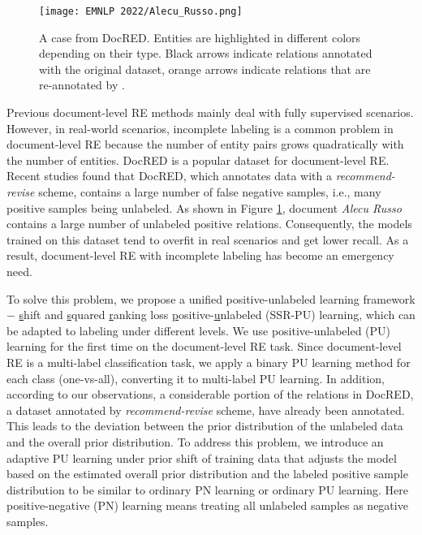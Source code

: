 \documentclass[11pt]{article}
\begin{document}
\begin{figure}
\centering
\texttt{[image: EMNLP 2022/Alecu\_Russo.png]} 
\caption{A case from DocRED. Entities are highlighted in different colors depending on their type. Black arrows indicate relations annotated with the original dataset, orange arrows indicate relations that are re-annotated by \citep{tan2022revisiting}.}
\label{fig1}
\end{figure}

Previous document-level RE methods mainly deal with fully supervised scenarios. However, in real-world scenarios, incomplete labeling is a common problem in document-level RE because the number of entity pairs grows quadratically with the number of entities. DocRED \citep{yao-etal-2019-docred} is a popular dataset for document-level RE. Recent studies \citep{huang-etal-2022-recommend, tan2022revisiting} found that DocRED, which annotates data with a \emph{recommend-revise} scheme, contains a large number of false negative samples, i.e., many positive samples being unlabeled. As shown in Figure \ref{fig1}, document \emph{Alecu Russo} contains a large number of unlabeled positive relations. Consequently, the models trained on this dataset tend to overfit in real scenarios and get lower recall. As a result, document-level RE with incomplete labeling has become an emergency need. 

To solve this problem, we propose a unified positive-unlabeled learning framework $-$ \underline{s}hift and \underline{s}quared \underline{r}anking loss \underline{p}ositive-\underline{u}nlabeled (SSR-PU) learning, which can be adapted to labeling under different levels. We use positive-unlabeled (PU) learning for the first time on the document-level RE task. Since document-level RE is a multi-label classification task, we apply a binary PU learning method for each class (one-vs-all), converting it to multi-label PU learning. In addition, according to our observations, a considerable portion of the relations in DocRED, a dataset annotated by \emph{recommend-revise} scheme, have already been annotated. This leads to the deviation between the prior distribution of the unlabeled data and the overall prior distribution. To address this problem, we introduce an adaptive PU learning under prior shift of training data that adjusts the model based on the estimated overall prior distribution and the labeled positive sample distribution to be similar to ordinary PN learning or ordinary PU learning. Here positive-negative (PN) learning means treating all unlabeled samples as negative samples.
\end{document}
